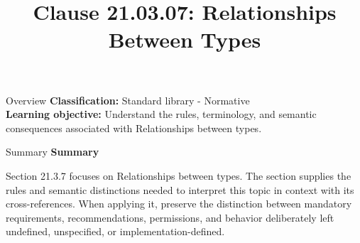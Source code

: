 \documentclass[10pt,letterpaper]{article}
\title{Clause 21.03.07: Relationships Between Types}
\author{}
\date{}
\begin{document}
\maketitle
\begin{CornellOverviewBox}{Overview}
\textbf{Classification:} Standard library - Normative\\[2pt]
\textbf{Learning objective:} Understand the rules, terminology, and semantic consequences associated with Relationships between types.
\end{CornellOverviewBox}\begin{CornellSummaryBox}{Summary}
{\sffamily\bfseries\color{Accent} Summary}\par\vspace{3pt}Section 21.3.7 focuses on Relationships between types. The section supplies the rules and semantic distinctions needed to interpret this topic in context with its cross-references. When applying it, preserve the distinction between mandatory requirements, recommendations, permissions, and behavior deliberately left undefined, unspecified, or implementation-defined.
\end{CornellSummaryBox}
\end{document}
